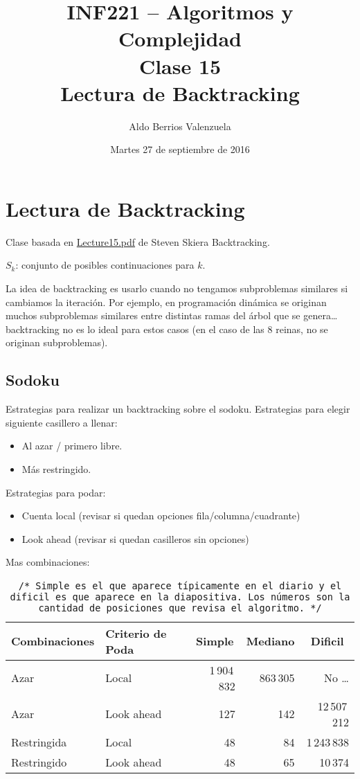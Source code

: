 \documentclass[english, spanish, fleqn, 10pt]{article}
\author{Aldo Berrios Valenzuela}
\title{INF221 -- Algoritmos y Complejidad\\[.4\baselineskip]Clase 15\\Lectura de Backtracking}
\date{Martes 27 de septiembre de 2016}
\newcommand{\comentarioc}[1]{\texttt{\textcolor{webred}{/* #1 */}}}
\numberwithin{equation}{section}
\theoremstyle{definition}
\begin{document}
\maketitle
\section{Lectura de Backtracking}
Clase basada en \href{http://www3.cs.stonybrook.edu/~algorith/video-lectures/2007/lecture15.pdf}{Lecture15.pdf} de Steven Skiera Backtracking.

$S_k$: conjunto de posibles continuaciones para $k$.

La idea de backtracking es usarlo cuando no tengamos subproblemas similares si cambiamos la iteración. Por ejemplo, en programación dinámica se originan muchos subproblemas similares entre distintas ramas del árbol que se genera\ldots backtracking no es lo ideal para estos casos (en el caso de las 8 reinas, no se originan subproblemas).

\subsection{Sodoku}
Estrategias para realizar un backtracking sobre el sodoku. Estrategias para elegir siguiente casillero a llenar:
\begin{itemize}
	\item Al azar / primero libre.
	
	\item Más restringido.
\end{itemize}
Estrategias para podar:
\begin{itemize}
	\item Cuenta local (revisar si quedan opciones fila/columna/cuadrante)
	
	\item Look ahead (revisar si quedan casilleros sin opciones)
\end{itemize}

Mas combinaciones:
\begin{table}[!h]
	\centering
	\begin{tabular}{l|l|r|r|r}
		\multicolumn{1}{c|}{Combinaciones} &Criterio de Poda & \multicolumn{1}{c|}{Simple} & \multicolumn{1}{c|}{Mediano} & \multicolumn{1}{c}{Dificil}\\
		\hline
		Azar & Local & 1\,904\,832 & 863\,305 & No \ldots\\
		Azar & Look ahead & 127 & 142 & 12\,507\,212\\
		Restringida & Local & 48 & 84 & 1\,243\,838\\
		Restringido & Look ahead & 48 & 65 & 10\,374
	\end{tabular}
	\caption{\comentarioc{Simple es el que aparece típicamente en el diario y el dificil es que aparece en la diapositiva. Los números son la cantidad de posiciones que revisa el algoritmo.}}
\end{table}
\end{document}

